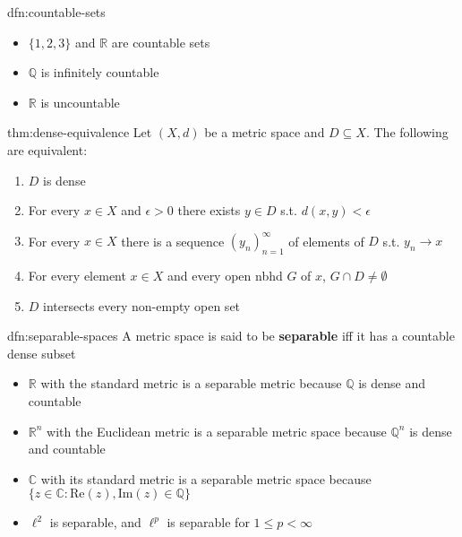 \documentclass[landscape, 8pt]{extarticle}
\begin{document}
\begin{multicols}{3}
\begin{dfn}{dfn:countable-sets}{}
    \begin{itemize}
        \item $\{1, 2, 3\}$ and $\mathbb{R}$ are countable sets
        \item $\mathbb{Q}$ is infinitely countable
        \item $\mathbb{R}$ is uncountable
    \end{itemize}
\end{dfn}

\begin{thm}{thm:dense-equivalence}{}
    Let $(X, d)$ be a metric space and $D \subseteq X$. The following are equivalent:
    \begin{enumerate}
        \item $D$ is dense
        \item For every $x\in X$ and $\epsilon > 0$ there exists $y\in D$ s.t. $d(x, y) < \epsilon$
        \item For every $x\in X$ there is a sequence $(y_{n})^{\infty}_{n = 1}$ of elements of $D$ s.t. $y_{n}\to x$
        \item For every element $x\in X$ and every open nbhd $G$ of $x$, $G \cap D \ne \emptyset$
        \item $D$ intersects every non-empty open set
    \end{enumerate}
\end{thm}

\newpage
\begin{dfn}{dfn:separable-spaces}{}
    A metric space is said to be \textbf{separable} iff it has a countable dense subset

    \begin{itemize}
        \item $\mathbb{R}$ with the standard metric is a separable metric because $\mathbb{Q}$ is dense and countable
        \item $\mathbb{R}^{n}$ with the Euclidean metric is a separable metric space because $\mathbb{Q}^{n}$ is dense and countable
        \item $\mathbb{C}$ with its standard metric is a separable metric space because $\{ z\in\mathbb{C} : \text{Re}(z), \text{Im}(z)\in \mathbb{Q}\}$
        \item $\ell^{2}$ is separable, and $\ell^{p}$ is separable for $1 \le p < \infty$
    \end{itemize}
\end{dfn}


\end{multicols}
\end{document}
